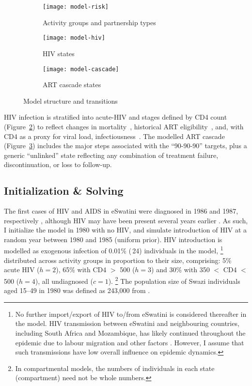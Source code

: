 \begin{figure}
  \begin{subfigure}{\linewidth}
    \texttt{[image: model-risk]}
    \caption{Activity groups and partnership types}
    \label{fig:model-risk}
  \end{subfigure}
  \begin{subfigure}{\linewidth}
    \texttt{[image: model-hiv]}
    \caption{HIV states}
    \label{fig:model-hiv}
  \end{subfigure}
  \begin{subfigure}{\linewidth}
    \texttt{[image: model-cascade]}
    \caption{ART cascade states}
    \label{fig:model-cascade}
  \end{subfigure}
  \caption{Model structure and transitions}
  \label{fig:model}
\end{figure}
\par
HIV infection is stratified into
acute-HIV and stages defined by CD4 count (Figure~\ref{fig:model-hiv})
to reflect changes in mortality~\cite{Mangal2017},
historical ART eligibility~\cite{EswUNGASS2010,MaxART2018},
and, with CD4 as a proxy for viral load, infectiousness~\cite{Boily2009}.
The modelled ART cascade (Figure~\ref{fig:model-cascade})
includes the major steps associated with the ``90-90-90'' targets,
plus a generic ``unlinked'' state reflecting any combination of
treatment failure, discontinuation, or loss to follow-up.
\subsection{Initialization \& Solving}\label{model.init}
The first cases of HIV and AIDS in eSwatini
were diagnosed in 1986 and 1987, respectively \cite{Whiteside2007},
although HIV may have been present several years earlier \cite{Iliffe2006}.
As such, I initialize the model in 1980 with no HIV,
and simulate introduction of HIV at a random year between 1980 and 1985 (uniform prior).
HIV introduction is modelled as
exogenous infection of 0.01\% (\ttilde\,24) individuals in the model,%
\footnote{No further import/export of HIV to/from eSwatini is considered thereafter in the model.
  HIV transmission between eSwatini and neighbouring countries,
  including South Africa and Mozambique,
  has likely continued throughout the epidemic
  due to labour migration and other factors \cite{Iliffe2006}.
  However, I assume that such transmissions have low overall influence on epidemic dynamics.}
distributed across activity groups in proportion to their size, comprising:
5\% acute HIV ($h=2$), 65\% with CD4 $>$ 500 ($h=3$) and 30\% with 350 $<$ CD4 $<$ 500 ($h=4$),
all undiagnosed ($c=1$).%
\footnote{In compartmental models, the numbers of individuals in each state (compartment)
  need not be whole numbers.}
The population size of Swazi individuals aged 15--49 in 1980
was defined as 243,000 from \cite{WorldBank}.

